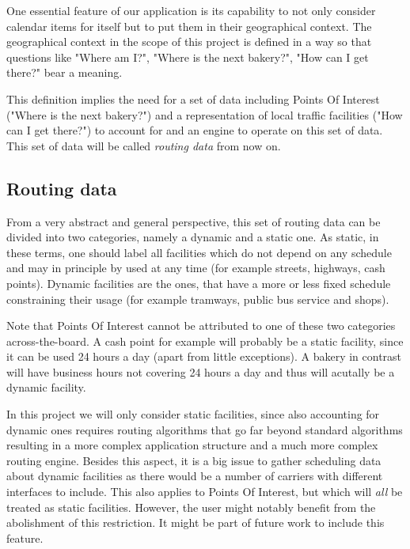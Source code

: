 One essential feature of our application is its capability to not only consider calendar items for itself but to put them in their geographical context. The geographical context in the scope of this project is defined in a way so that questions like "Where am I?", "Where is the next bakery?", "How can I get there?" bear a meaning.\newline

This definition implies the need for a set of data including Points Of Interest ("Where is the next bakery?") and a representation of  local traffic facilities ("How can I get there?") to account for and an engine to operate on this set of data. This set of data will be called \emph{routing data} from now on.\newline

\subsection{Routing data}

From a very abstract and general perspective, this set of routing data can be divided into two categories, namely a dynamic and a static one. As static, in these terms, one should label all facilities which do not depend on any schedule and may in principle by used at any time (for example streets, highways, cash points). Dynamic facilities are the ones, that have a more or less fixed schedule constraining their usage (for example tramways, public bus service and shops).\newline

Note that Points Of Interest cannot be attributed to one of these two categories across-the-board. A cash point for example will probably be a static facility, since it can be used 24 hours a day (apart from little exceptions). A bakery in contrast will have business hours not covering 24 hours a day and thus will acutally be a dynamic facility.\newline

In this project we will only consider static facilities, since also accounting for dynamic ones requires routing algorithms that go far beyond standard algorithms resulting in a more complex application structure and a much more complex routing engine. Besides this aspect, it is a big issue to gather scheduling data about dynamic facilities as there would be a number of carriers with different interfaces to include. This also applies to Points Of Interest, but which will \emph{all} be treated as static facilities. However, the user might notably benefit from the abolishment of this restriction. It might be part of future work to include this feature.\newline


